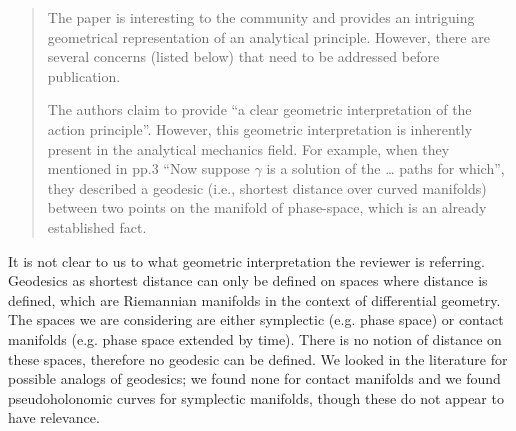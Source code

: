 \documentclass[11pt, executivepaper]{article}
\begin{document}
 

\begin{quote}
 The paper is interesting to the community and provides an intriguing geometrical representation of an analytical principle.  However, there are several concerns (listed below) that need to be addressed before publication.
 
 The authors claim to provide “a clear geometric interpretation of the action principle”. However, this geometric interpretation is inherently present in the analytical mechanics field. For example, when they mentioned in pp.3 “Now suppose $\gamma$ is a solution of the … paths for which”, they described a geodesic (i.e., shortest distance over curved manifolds) between two points on the manifold of phase-space, which is an already established fact.
\end{quote}
It is not clear to us to what geometric interpretation the reviewer is referring. Geodesics as shortest distance can only be defined on spaces where distance is defined, which are Riemannian manifolds in the context of differential geometry. The spaces we are considering are either symplectic (e.g. phase space) or contact manifolds (e.g. phase space extended by time). There is no notion of distance on these spaces, therefore no geodesic can be defined. We looked in the literature for possible analogs of geodesics; we found none for contact manifolds and we found pseudoholonomic curves for symplectic manifolds, though these do not appear to have relevance.
\end{document}

